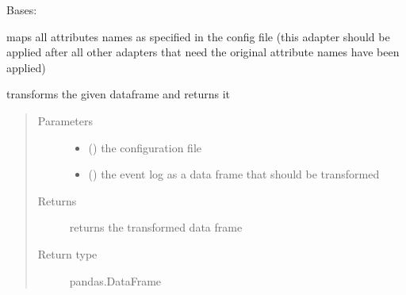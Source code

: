 \documentclass[letterpaper,10pt,english]{sphinxmanual}
\begin{document}

\begin{fulllineitems}
\label{\detokenize{event_log_analyzer:event_log_analyzer.adapter.ColumnRenamer}}
\sphinxAtStartPar
Bases: {\hyperref[\detokenize{event_log_analyzer:event_log_analyzer.adapter.Adapter}]{}}

\sphinxAtStartPar
maps all attributes names as specified in the config file (this adapter should be applied after all other adapters that need the original attribute names have been applied)

\begin{fulllineitems}
\label{\detokenize{event_log_analyzer:event_log_analyzer.adapter.ColumnRenamer.transform}}
\sphinxAtStartPar
transforms the given dataframe and returns it
\begin{quote}\begin{description}
\item[{Parameters}] \leavevmode\begin{itemize}
\item {} 
\sphinxAtStartPar
{} () \textendash{} the configuration file

\item {} 
\sphinxAtStartPar
{} () \textendash{} the event log as a data frame that should be transformed

\end{itemize}

\item[{Returns}] \leavevmode
\sphinxAtStartPar
returns the transformed data frame

\item[{Return type}] \leavevmode
\sphinxAtStartPar
pandas.DataFrame

\end{description}\end{quote}

\end{fulllineitems}


\end{fulllineitems}
\end{document}
